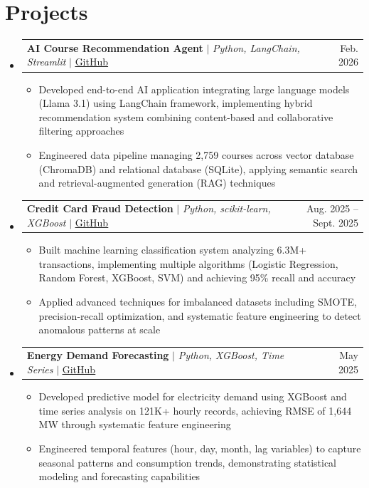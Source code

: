 \documentclass[letterpaper,11pt]{article}
\makeatletter
\newcommand{\resumeItem}[1]{
  \item\small{
    {#1 \vspace{-2pt}}
  }
}
\newcommand{\resumeProjectHeading}[2]{
    \item
    \begin{tabular*}{0.97\textwidth}{l@{\extracolsep{\fill}}r}
      \small#1 & #2 \\
    \end{tabular*}\vspace{-7pt}
}
\newcommand{\resumeSubHeadingListStart}{\begin{itemize}[leftmargin=0.15in, label={}]}
\newcommand{\resumeSubHeadingListEnd}{\end{itemize}}
\newcommand{\resumeItemListStart}{\begin{itemize}}
\newcommand{\resumeItemListEnd}{\end{itemize}\vspace{-5pt}}
\makeatother
\begin{document}
\section{Projects}
    \resumeSubHeadingListStart
      \resumeProjectHeading
          {\textbf{AI Course Recommendation Agent} $|$ \emph{Python, LangChain, Streamlit} $|$ \href{https://github.com/tksluangrath/course-recommnedation-agent}{\underline{GitHub}}}{Feb. 2026}
          \resumeItemListStart
            \resumeItem{Developed end-to-end AI application integrating large language models (Llama 3.1) using LangChain framework, implementing hybrid recommendation system combining content-based and collaborative filtering approaches}
            \resumeItem{Engineered data pipeline managing 2,759 courses across vector database (ChromaDB) and relational database (SQLite), applying semantic search and retrieval-augmented generation (RAG) techniques}
          \resumeItemListEnd
      \resumeProjectHeading
          {\textbf{Credit Card Fraud Detection} $|$ \emph{Python, scikit-learn, XGBoost} $|$ \href{https://github.com/tksluangrath/fraud-detection-app}{\underline{GitHub}}}{Aug. 2025 -- Sept. 2025}
          \resumeItemListStart
            \resumeItem{Built machine learning classification system analyzing 6.3M+ transactions, implementing multiple algorithms (Logistic Regression, Random Forest, XGBoost, SVM) and achieving 95\% recall and accuracy}
            \resumeItem{Applied advanced techniques for imbalanced datasets including SMOTE, precision-recall optimization, and systematic feature engineering to detect anomalous patterns at scale}
          \resumeItemListEnd
      \resumeProjectHeading
          {\textbf{Energy Demand Forecasting} $|$ \emph{Python, XGBoost, Time Series} $|$ \href{https://github.com/tksluangrath/energy-forecast-xgboost}{\underline{GitHub}}}{May 2025}
          \resumeItemListStart
            \resumeItem{Developed predictive model for electricity demand using XGBoost and time series analysis on 121K+ hourly records, achieving RMSE of 1,644 MW through systematic feature engineering}
            \resumeItem{Engineered temporal features (hour, day, month, lag variables) to capture seasonal patterns and consumption trends, demonstrating statistical modeling and forecasting capabilities}
          \resumeItemListEnd
    \resumeSubHeadingListEnd

\end{document}
